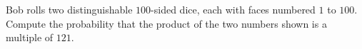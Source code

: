 Bob rolls two distinguishable $100$-sided dice, each with faces numbered $1$ to $100$. Compute the probability that the product of the two numbers shown is a multiple of $121$.
